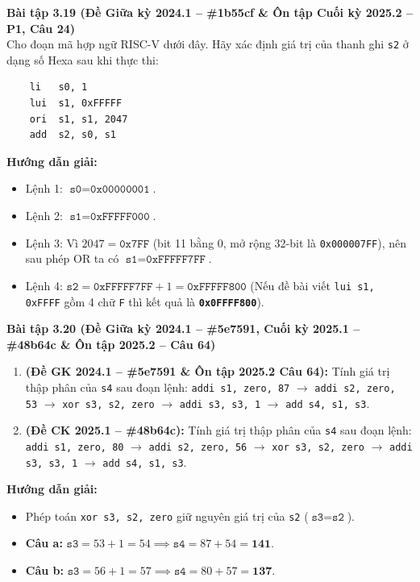 \textbf{Bài tập 3.19 (Đề Giữa kỳ 2024.1 -- \#1b55cf \& Ôn tập Cuối kỳ 2025.2 -- P1, Câu 24)}\\
Cho đoạn mã hợp ngữ RISC-V dưới đây. Hãy xác định giá trị của thanh ghi \texttt{s2} ở dạng số Hexa sau khi thực thi:
\begin{lstlisting}
    li   s0, 1
    lui  s1, 0xFFFFF
    ori  s1, s1, 2047
    add  s2, s0, s1
\end{lstlisting}
\textbf{Hướng dẫn giải:}
\begin{itemize}
    \item Lệnh 1: $\texttt{s0} = \texttt{0x00000001}$.
    \item Lệnh 2: $\texttt{s1} = \texttt{0xFFFFF000}$.
    \item Lệnh 3: Vì $2047 = \texttt{0x7FF}$ (bit 11 bằng 0, mở rộng 32-bit là \texttt{0x000007FF}), nên sau phép OR ta có $\texttt{s1} = \texttt{0xFFFFF7FF}$.
    \item Lệnh 4: $\texttt{s2} = \texttt{0xFFFFF7FF} + 1 = \mathbf{\texttt{0xFFFFF800}}$ (Nếu đề bài viết \texttt{lui s1, 0xFFFF} gồm 4 chữ \texttt{F} thì kết quả là \textbf{\texttt{0x0FFFF800}}).
\end{itemize}

\textbf{Bài tập 3.20 (Đề Giữa kỳ 2024.1 -- \#5e7591, Cuối kỳ 2025.1 -- \#48b64c \& Ôn tập 2025.2 -- Câu 64)}
\begin{enumerate}[label=\alph*)]
    \item \textbf{(Đề GK 2024.1 -- \#5e7591 \& Ôn tập 2025.2 Câu 64):} Tính giá trị thập phân của \texttt{s4} sau đoạn lệnh: \texttt{addi s1, zero, 87} $\rightarrow$ \texttt{addi s2, zero, 53} $\rightarrow$ \texttt{xor s3, s2, zero} $\rightarrow$ \texttt{addi s3, s3, 1} $\rightarrow$ \texttt{add s4, s1, s3}.
    \item \textbf{(Đề CK 2025.1 -- \#48b64c):} Tính giá trị thập phân của \texttt{s4} sau đoạn lệnh: \texttt{addi s1, zero, 80} $\rightarrow$ \texttt{addi s2, zero, 56} $\rightarrow$ \texttt{xor s3, s2, zero} $\rightarrow$ \texttt{addi s3, s3, 1} $\rightarrow$ \texttt{add s4, s1, s3}.
\end{enumerate}
\textbf{Hướng dẫn giải:}
\begin{itemize}
    \item Phép toán \texttt{xor s3, s2, zero} giữ nguyên giá trị của \texttt{s2} ($\texttt{s3} = \texttt{s2}$).
    \item \textbf{Câu a:} $\texttt{s3} = 53 + 1 = 54 \implies \texttt{s4} = 87 + 54 = \mathbf{141}$.
    \item \textbf{Câu b:} $\texttt{s3} = 56 + 1 = 57 \implies \texttt{s4} = 80 + 57 = \mathbf{137}$.
\end{itemize}

